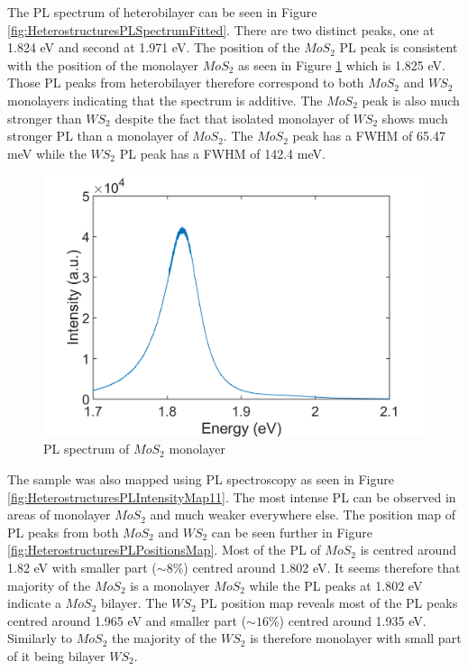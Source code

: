 The PL spectrum of heterobilayer can be seen in Figure \ref{fig:HeterostructuresPLSpectrumFitted}. There are two distinct peaks, one  at 1.824 eV and second at 1.971 eV. The position of the $MoS_2$ PL peak is consistent with the position of the monolayer $MoS_2$ as seen in Figure \ref{fig:HeterostructuresPLSpectrumMono} which is 1.825 eV. Those PL peaks from heterobilayer therefore correspond to both $MoS_2$ and $WS_2$ monolayers indicating that the spectrum is additive. The $MoS_2$ peak is also much stronger than $WS_2$ despite the fact that isolated monolayer of $WS_2$ shows much stronger PL than a monolayer of $MoS_2$. The $MoS_2$ peak has a FWHM of 65.47 meV while the $WS_2$ PL peak has a FWHM of 142.4 meV. 

\begin{figure}[H]
	\begin{center}
		\includegraphics[scale=0.3]{Heterostructures/HeterostructurePLSpectrumMono.png}
		\caption{PL spectrum of $MoS_2$ monolayer}
		\label{fig:HeterostructuresPLSpectrumMono}
	\end{center}
\end{figure}

The sample was also mapped using PL spectroscopy as seen in Figure \ref{fig:HeterostructuresPLIntensityMap11}. The most intense PL can be observed in areas of monolayer $MoS_2$ and much weaker everywhere else. The position map of PL peaks from both $MoS_2$ and $WS_2$ can be seen further in Figure \ref{fig:HeterostructuresPLPositionsMap}. Most of the PL of $MoS_2$ is centred around 1.82 eV with smaller part ($\sim 8 \%$) centred around 1.802 eV. It seems therefore that majority of the $MoS_2$ is a monolayer $MoS_2$ while the PL peaks at 1.802 eV indicate a $MoS_2$ bilayer. The $WS_2$ PL position map reveals most of the PL peaks centred around 1.965 eV and smaller part ($\sim 16 \%$) centred around 1.935 eV. Similarly to $MoS_2$ the majority of the $WS_2$ is therefore monolayer with small part of it being bilayer $WS_2$.

